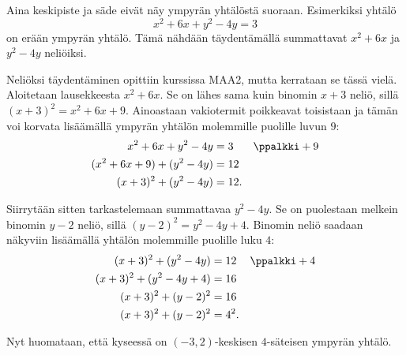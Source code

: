 

Aina keskipiste ja säde eivät näy ympyrän yhtälöstä suoraan.
Esimerkiksi yhtälö
\[
x^2+6x+y^2-4y=3
\]
on erään ympyrän yhtälö.
Tämä nähdään täydentämällä summattavat $x^2+6x$ ja $y^2-4y$ neliöiksi.

Neliöksi täydentäminen opittiin kurssissa MAA2, mutta kerrataan se tässä vielä.
Aloitetaan lausekkeesta $x^2+6x$. Se on lähes sama kuin binomin $x+3$ neliö, sillä $(x+3)^2=x^2+6x+9$. Ainoastaan vakiotermit poikkeavat toisistaan ja tämän voi korvata lisäämällä ympyrän yhtälön molemmille puolille luvun $9$: 
\begin{align*}
x^2+6x+y^2-4y &= 3 && \ppalkki +9 \\
(x^2+6x+9)+(y^2-4y) &= 12 && \\
(x+3)^2+(y^2-4y) &= 12.&& 
\end{align*}

Siirrytään sitten tarkastelemaan summattavaa $y^2-4y$. Se on puolestaan melkein binomin $y-2$ neliö, sillä $(y-2)^2=y^2-4y+4$. Binomin neliö saadaan näkyviin lisäämällä yhtälön molemmille puolille luku $4$:
\begin{align*}
(x+3)^2+(y^2-4y) &= 12 && \ppalkki +4\\
(x+3)^2+(y^2-4y+4) &= 16 && \\
(x+3)^2+(y-2)^2 &= 16 && \\
(x+3)^2+(y-2)^2 &= 4^2.&& 
\end{align*}

Nyt huomataan, että kyseessä on $(-3, 2)$-keskisen $4$-säteisen ympyrän yhtälö.

